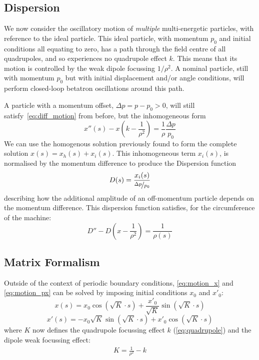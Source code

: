 \documentclass[11pt]{report}
\begin{document}
\subsection{Dispersion}\label{sec:transdisp}

We now consider the oscillatory motion of \textit{multiple} multi-energetic particles, with reference to the ideal particle. This ideal particle, with momentum $p_0$ and initial conditions all equating to zero, has a path through the field centre of all quadrupoles, and so experiences no quadrupole effect $k$. This means that its motion is controlled by the weak dipole focussing $1/\rho^2$. A nominal particle, still with momentum $p_0$ but with initial displacement and/or angle conditions, will perform closed-loop betatron oscillations around this path. 

A particle with a momentum offset, $\Delta p = p-p_0 > 0$, will still satisfy~\ref{eq:diff_motion} from before, but the inhomogeneous form
\begin{equation}
  x''(s)-x\left(k-\frac 1{\rho^2}\right)=\frac 1\rho\frac{\Delta p}{p_0}
\end{equation}
We can use the homogenous solution previously found to form the complete solution $x(s)=x_h(s)+x_i(s)$. This inhomogeneous term $x_i(s)$, is normalised by the momentum difference to produce the Dispersion function
\begin{equation}
  D(s)=\frac{x_i(s)}{\nicefrac{\Delta p}{p_0}}
  \label{eq:dispersion}
\end{equation} describing how the additional amplitude of an off-momentum particle depends on the momentum difference. 
This dispersion function satisfies, for the circumference of the machine:
\begin{equation}
  D''-D\left(x-\frac1{\rho^2}\right)=\frac 1{\rho(s)}
\end{equation}

\subsection{Matrix Formalism}\label{sec:matrix}

Outside of the context of periodic boundary conditions, \autoref{eq:motion_x} and \autoref{eq:motion_px} can be solved by imposing initial conditions $x_0$ and $x'_0$:
\begin{equation}
  x(s)=x_0\cos\left(\sqrt{K}\cdot s\right)+\frac{x'_0}{\sqrt{K}}\sin\left(\sqrt{K}\cdot s\right)
\end{equation}
\begin{equation}
  x'(s)=-x_0\sqrt{K}\sin\left(\sqrt{K}\cdot s\right)+x'_0\cos\left(\sqrt{K}\cdot s\right)
\end{equation}
where $K$ now defines the quadrupole focussing effect $k$ (\autoref{eq:quadrupole}) and the dipole weak focussing effect:
\begin{eqnarray}
  K=\frac1{\rho^2}-k
\end{eqnarray}
\end{document}
